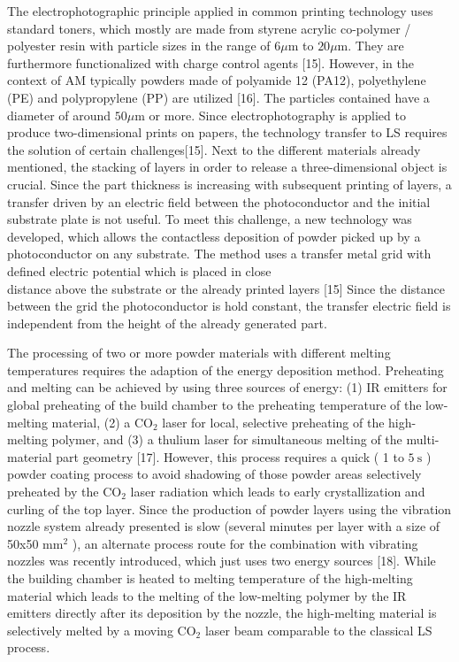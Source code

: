 \documentclass[10pt]{article}
\begin{document}
The electrophotographic principle applied in common printing technology uses standard toners, which mostly are made from styrene acrylic co-polymer / polyester resin with particle sizes in the range of $6 \mu \mathrm{m}$ to $20 \mu \mathrm{m}$. They are furthermore functionalized with charge control agents [15]. However, in the context of AM typically powders made of polyamide 12 (PA12), polyethylene (PE) and polypropylene (PP) are utilized [16]. The particles contained have a diameter of around $50 \mu \mathrm{m}$ or more. Since electrophotography is applied to produce two-dimensional prints on papers, the technology transfer to LS requires the solution of certain challenges[15]. Next to the different materials already mentioned, the stacking of layers in order to release a three-dimensional object is crucial. Since the part thickness is increasing with subsequent printing of layers, a transfer driven by an electric field between the photoconductor and the initial substrate plate is not useful. To meet this challenge, a new technology was developed, which allows the contactless deposition of powder picked up by a photoconductor on any substrate. The method uses a transfer metal grid with defined electric potential which is placed in close\\
distance above the substrate or the already printed layers [15] Since the distance between the grid the photoconductor is hold constant, the transfer electric field is independent from the height of the already generated part.

The processing of two or more powder materials with different melting temperatures requires the adaption of the energy deposition method. Preheating and melting can be achieved by using three sources of energy: (1) IR emitters for global preheating of the build chamber to the preheating temperature of the low-melting material, (2) a $\mathrm{CO}_{2}$ laser for local, selective preheating of the high-melting polymer, and (3) a thulium laser for simultaneous melting of the multi-material part geometry [17]. However, this process requires a quick ( 1 to $5 \mathrm{~s}$ ) powder coating process to avoid shadowing of those powder areas selectively preheated by the $\mathrm{CO}_{2}$ laser radiation which leads to early crystallization and curling of the top layer. Since the production of powder layers using the vibration nozzle system already presented is slow (several minutes per layer with a size of 50x50 $\mathrm{mm}^{2}$ ), an alternate process route for the combination with vibrating nozzles was recently introduced, which just uses two energy sources [18]. While the building chamber is heated to melting temperature of the high-melting material which leads to the melting of the low-melting polymer by the IR emitters directly after its deposition by the nozzle, the high-melting material is selectively melted by a moving $\mathrm{CO}_{2}$ laser beam comparable to the classical LS process.
\end{document}

